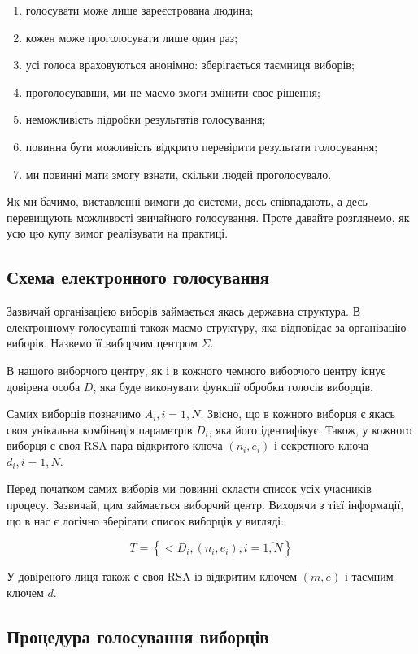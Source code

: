 \begin{enumerate}
    \item голосувати може лише зареєстрована людина;
    \item кожен може проголосувати лише один раз;
    \item усі голоса враховуються анонімно: зберігається таємниця виборів;
    \item проголосувавши, ми не маємо змоги змінити своє рішення;
    \item неможливість підробки результатів голосування;
    \item повинна бути можливість відкрито перевірити результати голосування;
    \item ми повинні мати змогу взнати, скільки людей проголосувало.
\end{enumerate}

Як ми бачимо, виставленні вимоги до системи, десь співпадають, а десь перевищують можливості звичайного
голосування. Проте давайте розглянемо, як усю цю купу вимог реалізувати на практиці.

\subsection{Схема електронного голосування}

Зазвичай організацією виборів займається якась державна структура.
В електронному голосуванні також маємо структуру, яка відповідає за організацію 
виборів. Назвемо її виборчим центром $\Sigma$.

В нашого виборчого центру, як і в кожного чемного виборчого центру існує довірена
особа $D$, яка буде виконувати функції обробки голосів виборців.

Самих виборців позначимо $A_i, i=\overline{1,N}$. Звісно, що в кожного виборця є
якась своя унікальна комбінація параметрів $D_i$, яка його ідентифікує. 
Також, у кожного виборця є своя RSA пара відкритого ключа $(n_i,e_i)$ і 
секретного ключа $d_i, i=\overline{1,N}$.

Перед початком самих виборів ми повинні скласти список усіх учасників процесу.
Зазвичай, цим займається виборчий центр. Виходячи з тієї інформації, що в нас є
логічно зберігати список виборців у вигляді:

\[ T = \left \{ <D_i, (n_i,e_i), i = \overline{1,N} \right\} \]

У довіреного лиця також є своя RSA із відкритим ключем $(m,e)$ і таємним ключем $d$.

\subsection{Процедура голосування виборців}

